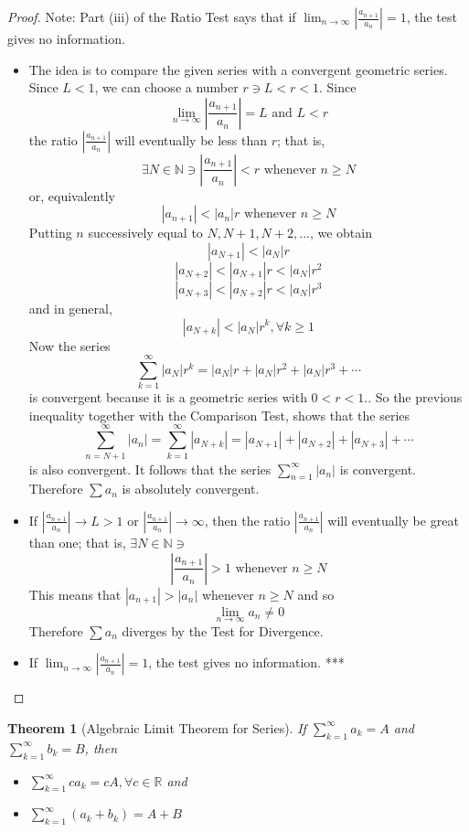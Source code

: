 \documentclass[10pt]{report}
\newtheorem{thm2}{Theorem}[section]
\begin{document}
\begin{proof}
Note: Part (iii) of the Ratio Test says that if $\lim_{n\to \infty} \left| \frac{a_{n+1}}{a_n}\right| =1$, the test gives no information.
\begin{itemize}
\item[(i)] The idea is to compare the given series with a convergent geometric series. Since $L<1$, we can choose a number $r\ni L<r<1$. Since
$$\lim_{n\to\infty}\left|\frac{a_{n+1}}{a_n}\right| = L \text{   and   } L<r$$
the ratio $\left| \frac{a_{n+1}}{a_n}\right|$ will eventually be less than $r$; that is, 
$$\exists N\in\mathbb{N}\ni \left|\frac{a_{n+1}}{a_n}\right|<r \text{   whenever   } n\geq N$$
or, equivalently
$$|a_{n+1}| < |a_n|r \text{   whenever   } n\geq N$$
Putting $n$ successively equal to $N,N+1,N+2,...$, we obtain
$$|a_{N+1}|<|a_N|r$$
$$|a_{N+2}|<|a_{N+1}|r<|a_N|r^2$$
$$|a_{N+3}|<|a_{N+2}|r<|a_N|r^3$$
and in general,
$$|a_{N+k}| < |a_N|r^k, \forall k\geq 1$$
Now the series
$$\sum_{k=1}^\infty |a_N|r^k = |a_N|r + |a_N|r^2 + |a_N|r^3 + \cdots$$
is convergent because it is a geometric series with $0<r<1$.. So the previous inequality together with the Comparison Test, shows that the series
$$\sum_{n=N+1}^\infty|a_n| = \sum_{k=1}^\infty |a_{N+k}| = |a_{N+1}|+|a_{N+2}|+|a_{N+3}|+\cdots$$
is also convergent. It follows that the series $\sum_{n=1}^\infty |a_n|$ is convergent. Therefore $\sum a_n$ is absolutely convergent.
\item[(ii)] If $\left|\frac{a_{n+1}}{a_n}\right|\to L > 1$ or $\left|\frac{a_{n+1}}{a_n}\right|\to \infty$, then the ratio $\left|\frac{a_{n+1}}{a_n}\right|$ will eventually be great than one; that is, $\exists N \in \mathbb{N}\ni$
$$\left|\frac{a_{n+1}}{a_n}\right|>1 \text{  whenever  } n\geq N$$
This means that $|a_{n+1}|>|a_n|$ whenever $n\geq N$ and so
$$\lim_{n\to \infty}a_n\neq 0$$
Therefore $\sum a_n$ diverges by the Test for Divergence.
\item[(iii)] If $\lim_{n\to \infty}\left| \frac{a_{n+1}}{a_n}\right| = 1$, the test gives no information. ***
\end{itemize}
\end{proof}
\begin{thm2}[Algebraic Limit Theorem for Series]
If $\sum_{k=1}^\infty a_k =A$ and $\sum_{k=1}^\infty b_k =B$, then
\begin{itemize}
\item[(i)] $\sum_{k=1}^\infty ca_k = cA, \forall c\in\mathbb{R}$ and
\item[(ii)] $\sum_{k=1}^\infty(a_k + b_k) = A + B$ 
\end{itemize}
\end{thm2}
\end{document}
